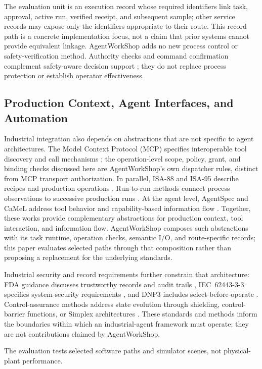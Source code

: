 The evaluation unit is an execution record whose required identifiers link
task, approval, active run, verified receipt, and subsequent sample; other
service records may expose only the identifiers appropriate to their route.
This record path is a concrete implementation focus, not a claim that prior
systems cannot provide equivalent linkage. AgentWorkShop adds no new process
control or safety-verification method. Authority checks and command
confirmation complement safety-aware decision support
\cite{jiang2026agentic}; they do not replace process protection or establish
operator effectiveness.

\subsection{Production Context, Agent Interfaces, and Automation}
Industrial integration also depends on abstractions that are not specific to
agent architectures. The Model Context Protocol (MCP) specifies interoperable
tool discovery and call mechanisms \cite{mcp2024}; the operation-level scope,
policy, grant, and binding checks discussed here are AgentWorkShop's own
dispatcher rules, distinct from MCP transport authorization. In parallel,
ISA-88 and ISA-95 describe recipes and production operations
\cite{isa88_2010,isa95_2025}. Run-to-run methods connect process observations
to successive production runs \cite{moyne2000r2r}. At the agent level,
AgentSpec and CaMeL address tool behavior and capability-based information
flow \cite{wang2025agentspec,debenedetti2025camel}. Together, these works
provide complementary abstractions for production context, tool interaction,
and information flow. AgentWorkShop composes such abstractions with its task
runtime, operation checks, semantic I/O, and route-specific records; this
paper evaluates selected paths through that composition rather than proposing
a replacement for the underlying standards.

Industrial security and record requirements further constrain that
architecture: FDA guidance discusses trustworthy records and audit trails
\cite{part11}, IEC~62443-3-3 specifies system-security requirements
\cite{iec62443-3-3}, and DNP3 includes select-before-operate
\cite{ieee1815dnp3}. Control-assurance methods address state evolution through
shielding, control-barrier functions, or Simplex architectures
\cite{alshiekh2018shielding,ames2017cbf,sha2001simplex}. These standards and
methods inform the boundaries within which an industrial-agent framework must
operate; they are not contributions claimed by AgentWorkShop.

The evaluation tests selected software paths and simulator scenes, not
physical-plant performance.
